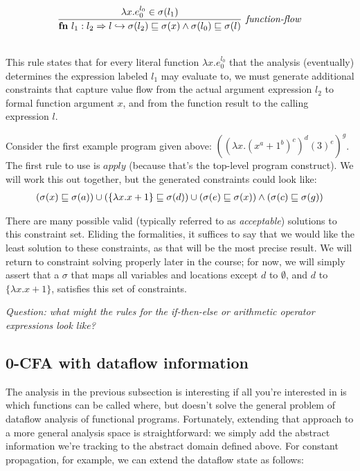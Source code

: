 \documentclass[11pt]{article}
\begin{document}
\[
\begin{array}{c}
\infer[\textit{function-flow}]
	{\textbf{fn}~l_1: l_2 \Rightarrow l \hookrightarrow \sigma(l_2) \alap \sigma(x) \land \sigma(l_0) \alap \sigma(l)}
	{\lambda x . e_0^{l_0} \in \sigma(l_1)}\\[3ex]
	
\end{array}
\]


This rule states that for every literal function $\lambda x . e_0^{l_0}$ that
the analysis (eventually) determines the expression labeled $l_1$ may evaluate
to, we must generate additional constraints that capture value flow from the
actual argument expression $l_2$ to formal function argument $x$, and from the
function result to the calling expression $l$.

Consider the first example program given above: $((\lambda x . (x^a + 1^b)^c)^d (3)^e)^g$.
The first rule to use is $apply$ (because that's the top-level program
construct). We will work this out together, but the generated constraints could
look like:
\[
\begin{array}{cc}
(\sigma(x) \sqsubseteq \sigma(a)) \cup (\{ \lambda x.x + 1\} \sqsubseteq \sigma(d)) 
\cup (\sigma(e) \sqsubseteq \sigma (x)) \wedge (\sigma (c) \sqsubseteq \sigma (g))
\end{array}
\]


There are many possible valid (typically referred to as \emph{acceptable})
solutions to this constraint set. Eliding the formalities, it suffices to say
that we would like the least solution to these constraints, as that will be the
most precise result. We will return to constraint solving properly later in the
course; for now, we will simply assert that a $\sigma$ that maps all variables
and locations except $d$ to $\emptyset$, and $d$ to $\{ \lambda x . x + 1 \}$,
satisfies this set of constraints.


\vspace{1ex}
\noindent\emph{Question: what might the rules for the if-then-else or arithmetic
  operator expressions look like?}

\subsection{0-CFA with dataflow information}

The analysis in the previous subsection is interesting if all you're interested
in is which functions can be called where, but doesn't solve the general problem
of dataflow analysis of functional programs. Fortunately, extending that
approach to a more general analysis space is straightforward: we simply add the
abstract information we're tracking to the abstract domain defined above. For
constant propagation, for example, we can extend the dataflow state as follows:
\end{document}
